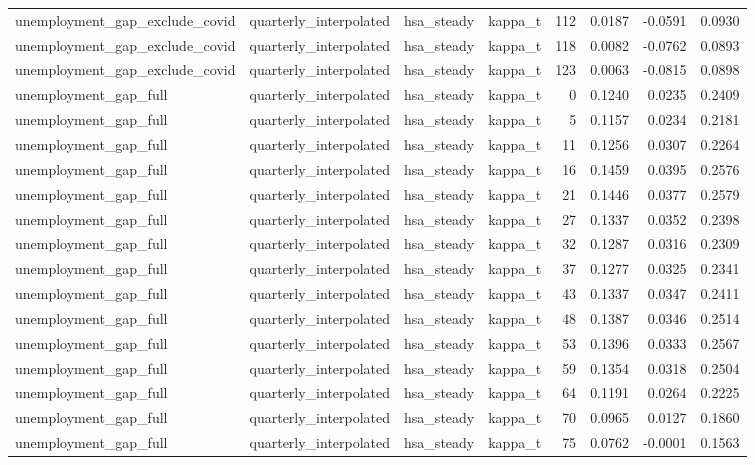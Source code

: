 \begin{tabular}{llllrrrr}
unemployment\_gap\_exclude\_covid & quarterly\_interpolated & hsa\_steady & kappa\_t & 112 & 0.0187 & -0.0591 & 0.0930 \\
unemployment\_gap\_exclude\_covid & quarterly\_interpolated & hsa\_steady & kappa\_t & 118 & 0.0082 & -0.0762 & 0.0893 \\
unemployment\_gap\_exclude\_covid & quarterly\_interpolated & hsa\_steady & kappa\_t & 123 & 0.0063 & -0.0815 & 0.0898 \\
unemployment\_gap\_full & quarterly\_interpolated & hsa\_steady & kappa\_t & 0 & 0.1240 & 0.0235 & 0.2409 \\
unemployment\_gap\_full & quarterly\_interpolated & hsa\_steady & kappa\_t & 5 & 0.1157 & 0.0234 & 0.2181 \\
unemployment\_gap\_full & quarterly\_interpolated & hsa\_steady & kappa\_t & 11 & 0.1256 & 0.0307 & 0.2264 \\
unemployment\_gap\_full & quarterly\_interpolated & hsa\_steady & kappa\_t & 16 & 0.1459 & 0.0395 & 0.2576 \\
unemployment\_gap\_full & quarterly\_interpolated & hsa\_steady & kappa\_t & 21 & 0.1446 & 0.0377 & 0.2579 \\
unemployment\_gap\_full & quarterly\_interpolated & hsa\_steady & kappa\_t & 27 & 0.1337 & 0.0352 & 0.2398 \\
unemployment\_gap\_full & quarterly\_interpolated & hsa\_steady & kappa\_t & 32 & 0.1287 & 0.0316 & 0.2309 \\
unemployment\_gap\_full & quarterly\_interpolated & hsa\_steady & kappa\_t & 37 & 0.1277 & 0.0325 & 0.2341 \\
unemployment\_gap\_full & quarterly\_interpolated & hsa\_steady & kappa\_t & 43 & 0.1337 & 0.0347 & 0.2411 \\
unemployment\_gap\_full & quarterly\_interpolated & hsa\_steady & kappa\_t & 48 & 0.1387 & 0.0346 & 0.2514 \\
unemployment\_gap\_full & quarterly\_interpolated & hsa\_steady & kappa\_t & 53 & 0.1396 & 0.0333 & 0.2567 \\
unemployment\_gap\_full & quarterly\_interpolated & hsa\_steady & kappa\_t & 59 & 0.1354 & 0.0318 & 0.2504 \\
unemployment\_gap\_full & quarterly\_interpolated & hsa\_steady & kappa\_t & 64 & 0.1191 & 0.0264 & 0.2225 \\
unemployment\_gap\_full & quarterly\_interpolated & hsa\_steady & kappa\_t & 70 & 0.0965 & 0.0127 & 0.1860 \\
unemployment\_gap\_full & quarterly\_interpolated & hsa\_steady & kappa\_t & 75 & 0.0762 & -0.0001 & 0.1563 \\

\end{tabular}
